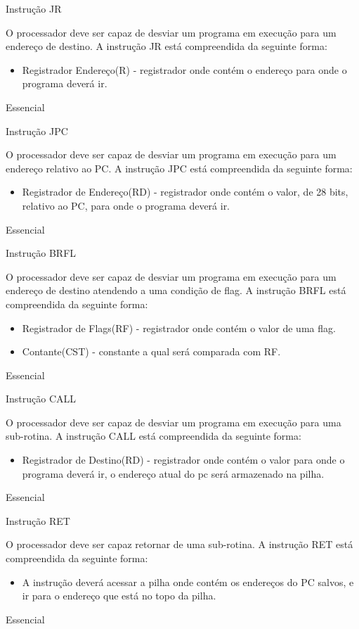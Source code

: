 \documentclass{article}
\begin{document}
    \begin{functional}
      \requirement
      {Instrução JR}
      {O processador deve ser capaz de desviar um programa em execução para um endereço de destino.
      A instrução JR está compreendida da seguinte forma:
       \begin{itemize}
         \item Registrador Endereço(R) - registrador onde contém o endereço para onde o programa deverá ir.
         \end{itemize}
         }
      {Essencial}

      \requirement
      {Instrução JPC}
      {O processador deve ser capaz de desviar um programa em execução para um endereço relativo ao PC.
      A instrução JPC está compreendida da seguinte forma:
       \begin{itemize}
         \item Registrador de Endereço(RD) - registrador onde contém o valor, de 28 bits, relativo ao PC, para onde o programa deverá ir.
         \end{itemize}
         }
      {Essencial}

      \requirement
      {Instrução BRFL}
      {O processador deve ser capaz de desviar um programa em execução para um endereço de destino atendendo a uma condição de flag.
      A instrução BRFL está compreendida da seguinte forma:
       \begin{itemize}
         \item Registrador de Flags(RF) - registrador onde contém o valor de uma flag.
         \item Contante(CST) - constante a qual será comparada com RF.
         \end{itemize}
         }
      {Essencial}

      \requirement
      {Instrução CALL}
      {O processador deve ser capaz de desviar um programa em execução para uma sub-rotina.
      A instrução CALL está compreendida da seguinte forma:
       \begin{itemize}
         \item Registrador de Destino(RD) - registrador onde contém o valor para onde o programa deverá ir, o endereço atual do pc será armazenado na pilha.
        \end{itemize}
        }
      {Essencial}

      \requirement
      {Instrução RET}
      {O processador deve ser capaz retornar de uma sub-rotina.
      A instrução RET está compreendida da seguinte forma:
      \begin{itemize}
         \item A instrução deverá acessar a pilha onde contém os endereços do PC salvos, e ir para o endereço que está no topo da pilha.
        \end{itemize}
        }
      {Essencial}



    \end{functional}
\end{document}
